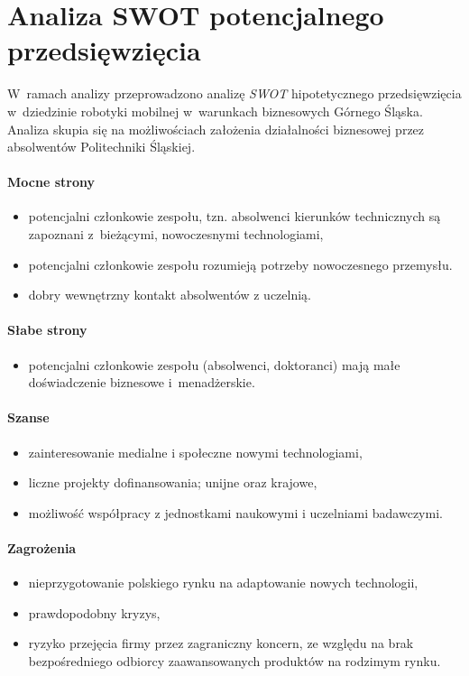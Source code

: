 \section{Analiza SWOT potencjalnego przedsięwzięcia}
W~ramach analizy przeprowadzono analizę \textit{SWOT} hipotetycznego
przedsięwzięcia w~dziedzinie robotyki mobilnej w~warunkach biznesowych Górnego
Śląska.
Analiza skupia się na możliwościach założenia działalności biznesowej przez
absolwentów Politechniki Śląskiej.

\paragraph{Mocne strony}
\begin{itemize}
	\item potencjalni członkowie zespołu, tzn. absolwenci kierunków technicznych
		  są zapoznani z~bieżącymi, nowoczesnymi technologiami,
	\item potencjalni członkowie zespołu rozumieją potrzeby nowoczesnego
		  przemysłu.
	\item dobry wewnętrzny kontakt absolwentów z uczelnią.
\end{itemize}

\paragraph{Słabe strony}
\begin{itemize}
	\item potencjalni członkowie zespołu (absolwenci, doktoranci) mają małe
          doświadczenie biznesowe i~menadżerskie.
\end{itemize}

\paragraph{Szanse}
\begin{itemize}
	\item zainteresowanie medialne i społeczne nowymi technologiami,
	\item liczne projekty dofinansowania; unijne oraz krajowe,
    \item możliwość współpracy z jednostkami naukowymi i uczelniami badawczymi.
\end{itemize}

\paragraph{Zagrożenia}
\begin{itemize}
	\item nieprzygotowanie polskiego rynku na adaptowanie nowych technologii,
	\item prawdopodobny kryzys,
	\item ryzyko przejęcia firmy przez zagraniczny koncern, ze względu na brak
          bezpośredniego odbiorcy zaawansowanych produktów na rodzimym rynku.
\end{itemize}
